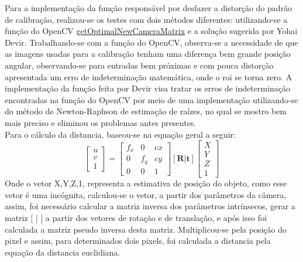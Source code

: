 \documentclass{bmvc2k}
\begin{document}
Para a implementação da função responsável por desfazer a distorção do padrão de calibração, realizou-se os testes com dois métodos diferentes: utilizando-se a função do OpenCV \href{https://docs.opencv.org/2.4/modules/calib3d/doc/camera_calibration_and_3d_reconstruction.html#getoptimalnewcameramatrix}{getOptimalNewCameraMatrix} e a solução sugerida por Yohai Devir\cite{Devir01}. Trabalhando-se com a função do OpenCV, observa-se a necessidade de que as imagens usadas para a calibração tenham uma diferença bem grande posição angular, observando-se para entradas bem próximas e com pouca distorção apresentada um erro de indeterminação matemática, onde o roi se torna zero. A implementação da função feita por Devir visa tratar os erros de indeterminação encontradas na função do OpenCV por meio de uma implementação utilizando-se do método de Newton-Raphson de estimação de raízes, no qual se mostro bem mais preciso e eliminou os problemas antes presentes.\\
Para o cálculo da distancia, baseou-se na equação geral a seguir:
\begin{equation}
\left[ \begin{array}{l}{u} \\ {v} \\ {1}\end{array}\right]=\left[ \begin{array}{lll}{f_{x}} & {0} & {c x} \\ {0} & {f_{y}} & {c y} \\ {0} & {0} & {1}\end{array}\right][\mathbf{R} | \mathbf{t}] \left[ \begin{array}{c}{X} \\ {Y} \\ {Z} \\ {1}\end{array}\right]
\end{equation}
Onde o vetor X,Y,Z,1, representa a estimativa de posição do objeto, como esse vetor é uma incógnita, calculou-se o vetor, a partir dos parâmetros da câmera, assim, foi necessário calcular a matriz inversa dos parâmetros intrínsecos, gerar a matriz [ | ] a partir dos vetores de rotação e de translação, e após isso foi calculada a matriz pseudo inversa desta matriz. Multiplicou-se pela posição do pixel e assim, para determinados dois pixels, foi calculada a distancia pela equação da distancia euclidiana.
\end{document}
